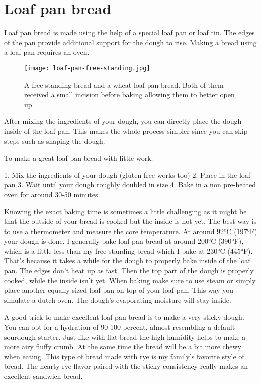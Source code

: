 \section{Loaf pan bread}

Loaf pan bread is made using the help of a special loaf pan
or loaf tin. The edges of the pan provide additional support
for the dough to rise. Making a bread using a loaf pan requires
an oven.

\begin{figure}[!htb]
  \texttt{[image: loaf-pan-free-standing.jpg]}
  \caption{A free standing bread and a wheat loaf pan bread. Both of them
  received a small incision before baking allowing them to
  better open up}
  \label{fig:free-standing-loaf-pan}
\end{figure}

After mixing the ingredients of your dough, you can directly
place the dough inside of the loaf pan. This makes the whole
process simpler since you can skip steps such as shaping the dough.

To make a great loaf pan bread with little work:

1. Mix the ingredients of your dough (gluten free works too)
2. Place in the loaf pan
3. Wait until your dough roughly doubled in size
4. Bake in a non pre-heated oven for around 30-50 minutes

Knowing the exact baking time is sometimes a little challenging
as it might be that the outside of your bread is cooked but
the inside is not yet. The best way is to use a thermometer
and measure the core temperature. At around 92°C (197°F) your
dough is done. I generally bake loaf pan bread at around 200°C (390°F),
which is a little less than my free standing bread which I bake
at 230°C (445°F). That's because it takes a while for the dough
to properly bake inside of the loaf pan. The edges don't heat up
as fast. Then the top part of the dough is properly cooked, while
the inside isn't yet. When baking make sure to use steam
or simply place another equally sized loaf pan on top
of your loaf pan. This way you simulate a dutch oven. The dough's
evaporating moisture will stay inside.

A good trick to make excellent loaf pan bread is to make a very
sticky dough. You can opt for a hydration of 90-100 percent, almost
resembling a default sourdough starter. Just like with flat bread
the high humidity helps to make a more airy fluffy crumb. At
the same time the bread will be a bit more chewy when eating. This
type of bread made with rye is my family's favorite style of bread.
The hearty rye flavor paired with the sticky consistency really
makes an excellent sandwich bread.

